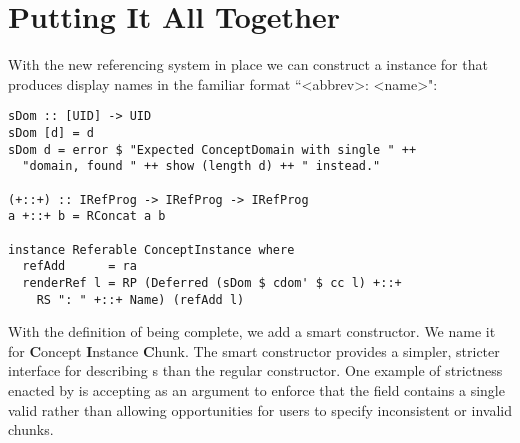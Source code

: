 \section{Putting It All Together}\label{ciFinale}
With the new referencing system in place we can construct a  instance for  that produces display names in the familiar format ``<abbrev>: <name>":

\begin{tcolorbox}
\begin{verbatim}
sDom :: [UID] -> UID
sDom [d] = d
sDom d = error $ "Expected ConceptDomain with single " ++
  "domain, found " ++ show (length d) ++ " instead."

(+::+) :: IRefProg -> IRefProg -> IRefProg
a +::+ b = RConcat a b

instance Referable ConceptInstance where
  refAdd      = ra
  renderRef l = RP (Deferred (sDom $ cdom' $ cc l) +::+
  	RS ": " +::+ Name) (refAdd l)
\end{verbatim}
\end{tcolorbox}

With the definition of  being complete, we add a smart constructor. We name it  for \textbf{C}oncept \textbf{I}nstance \textbf{C}hunk. The smart constructor provides a simpler, stricter interface for describing s than the regular constructor. One example of strictness enacted by  is accepting  as an argument to enforce that the  field contains a single valid  rather than allowing opportunities for users to specify inconsistent or invalid chunks. 

%

